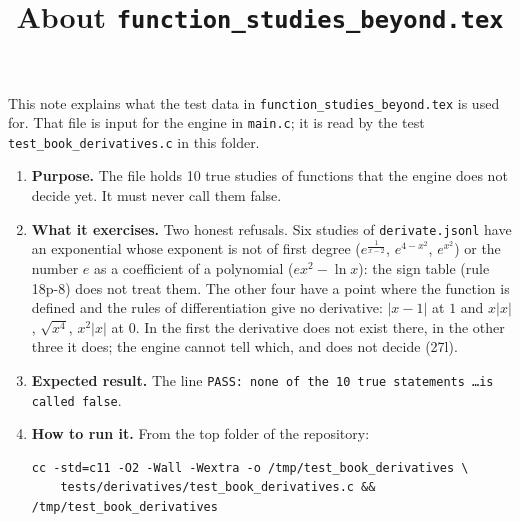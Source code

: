 \documentclass[11pt,a4paper]{article}
\title{About \texttt{function\_studies\_beyond.tex}}
\author{}
\date{}
\begin{document}
\maketitle
This note explains what the test data in \texttt{function\_studies\_beyond.tex} is used for. That file is input for the engine in \texttt{main.c}; it is read by the test \texttt{test\_book\_derivatives.c} in this folder.

\begin{enumerate}
\item \textbf{Purpose.} The file holds 10 true studies of functions that the engine does not decide yet. It must never call them false.

\item \textbf{What it exercises.} Two honest refusals. Six studies of \texttt{derivate.jsonl} have an exponential whose exponent is not of first degree ($e^{\frac{1}{x - 2}}$, $e^{4 - x^{2}}$, $e^{x^{2}}$) or the number $e$ as a coefficient of a polynomial ($e x^{2} - \ln x$): the sign table (rule 18p-8) does not treat them. The other four have a point where the function is defined and the rules of differentiation give no derivative: $|x - 1|$ at $1$ and $x|x|$, $\sqrt{x^{4}}$, $x^{2}|x|$ at $0$. In the first the derivative does not exist there, in the other three it does; the engine cannot tell which, and does not decide (27l).

\item \textbf{Expected result.} The line \texttt{PASS: none of the 10 true statements \ldots is called false}.

\item \textbf{How to run it.} From the top folder of the repository:
\begin{verbatim}
cc -std=c11 -O2 -Wall -Wextra -o /tmp/test_book_derivatives \
    tests/derivatives/test_book_derivatives.c && /tmp/test_book_derivatives
\end{verbatim}
\end{enumerate}
\end{document}
